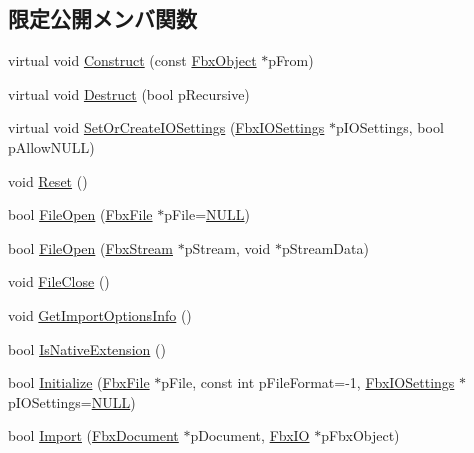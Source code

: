 \subsection*{限定公開メンバ関数}
\begin{DoxyCompactItemize}
\item 
virtual void \hyperlink{class_fbx_importer_ada4dcdb8770ebe90bacd9adcb3f562c0}{Construct} (const \hyperlink{class_fbx_object}{Fbx\+Object} $\ast$p\+From)
\item 
virtual void \hyperlink{class_fbx_importer_a891b4689233ee23cc00061c18c9f8e99}{Destruct} (bool p\+Recursive)
\item 
virtual void \hyperlink{class_fbx_importer_a9d2169ad70921ff3f8c4a944fdd214df}{Set\+Or\+Create\+I\+O\+Settings} (\hyperlink{class_fbx_i_o_settings}{Fbx\+I\+O\+Settings} $\ast$p\+I\+O\+Settings, bool p\+Allow\+N\+U\+LL)
\item 
void \hyperlink{class_fbx_importer_a2c3b438ff0b69b88907092aa4664a21b}{Reset} ()
\item 
bool \hyperlink{class_fbx_importer_ad487d1959b23e046c0b3a97b3897a796}{File\+Open} (\hyperlink{class_fbx_file}{Fbx\+File} $\ast$p\+File=\hyperlink{fbxarch_8h_a070d2ce7b6bb7e5c05602aa8c308d0c4}{N\+U\+LL})
\item 
bool \hyperlink{class_fbx_importer_ada6cc940ae40f0a401e6526089768fa5}{File\+Open} (\hyperlink{class_fbx_stream}{Fbx\+Stream} $\ast$p\+Stream, void $\ast$p\+Stream\+Data)
\item 
void \hyperlink{class_fbx_importer_ad3bdeef0246ffd257676b60d8c0f3b3c}{File\+Close} ()
\item 
void \hyperlink{class_fbx_importer_a2d4879dada04a1ad2e41617de6538d2e}{Get\+Import\+Options\+Info} ()
\item 
bool \hyperlink{class_fbx_importer_a27e8f015196b8cd2c549ab688fea09ab}{Is\+Native\+Extension} ()
\item 
bool \hyperlink{class_fbx_importer_a44f63c541843f3f84d0a84a202dd1e1b}{Initialize} (\hyperlink{class_fbx_file}{Fbx\+File} $\ast$p\+File, const int p\+File\+Format=-\/1, \hyperlink{class_fbx_i_o_settings}{Fbx\+I\+O\+Settings} $\ast$p\+I\+O\+Settings=\hyperlink{fbxarch_8h_a070d2ce7b6bb7e5c05602aa8c308d0c4}{N\+U\+LL})
\item 
bool \hyperlink{class_fbx_importer_a04bd6be7ae002ef88084e50ef4b43164}{Import} (\hyperlink{class_fbx_document}{Fbx\+Document} $\ast$p\+Document, \hyperlink{class_fbx_i_o}{Fbx\+IO} $\ast$p\+Fbx\+Object)
\end{DoxyCompactItemize}
